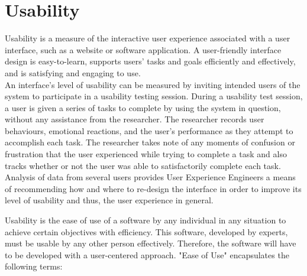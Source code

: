 \section{Usability}

Usability is a measure of the interactive user experience associated with a user interface, such as a website or software application. A user-friendly interface design is easy-to-learn, supports users' tasks and goals efficiently and effectively, and is satisfying and engaging to use.\\

An interface's level of usability can be measured by inviting intended users of the system to participate in a usability testing session. During a usability test session, a user is given a series of tasks to complete by using the system in question, without any assistance from the researcher. The researcher records user behaviours, emotional reactions, and the user's performance as they attempt to accomplish each task. The researcher takes note of any moments of confusion or frustration that the user experienced while trying to complete a task and also tracks whether or not the user was able to satisfactorily complete each task. Analysis of data from several users provides User Experience Engineers a means of recommending how and where to re-design the interface in order to improve its level of usability and thus, the user experience in general.

\smallskip

Usability is the ease of use of a software by any individual in any situation to achieve certain objectives with efficiency. This software, developed by experts, must be usable by any other person effectively. Therefore, the software will have to be developed with a user-centered approach. "Ease of Use" encapsulates the following terms:

